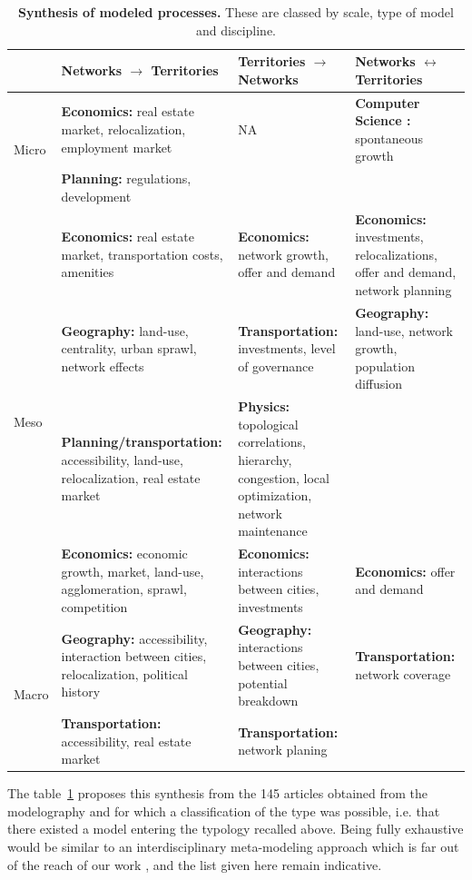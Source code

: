 \documentclass[10pt]{article}
\begin{document}
\begin{table}%
\caption{\textbf{Synthesis of modeled processes.} These are classed by scale, type of model and discipline. \label{tab:modelography:processes}}
\begin{tabular}{|l|p{5cm}|p{5cm}|p{5cm}|}
\hline
 & Networks $\rightarrow$ Territories & Territories $\rightarrow$ Networks & Networks $\leftrightarrow$ Territories\\ \hline
\multirow{2}{*}{Micro} &
\textbf{Economics: } real estate market, relocalization, employment market & NA & \textbf{Computer Science : } spontaneous growth \\\cline{2-2}
& \textbf{Planning: } regulations, development & & \\\hline
& \textbf{Economics: } real estate market, transportation costs, amenities & \textbf{Economics: } network growth, offer and demand & \textbf{Economics: } investments, relocalizations, offer and demand, network planning\\\cline{2-4}
\multirow{2}{*}{Meso}& \textbf{Geography: } land-use, centrality, urban sprawl, network effects & \textbf{Transportation: } investments, level of governance & \textbf{Geography: } land-use, network growth, population diffusion \\\cline{2-3}
& \textbf{Planning/transportation: } accessibility, land-use, relocalization, real estate market & \textbf{Physics: } topological correlations, hierarchy, congestion, local optimization, network maintenance & \\\hline
& \textbf{Economics: } economic growth, market, land-use, agglomeration, sprawl, competition & \textbf{Economics: } interactions between cities, investments & \textbf{Economics: } offer and demand \\ \cline{2-4}
\multirow{2}{*}{Macro} & \textbf{Geography: } accessibility, interaction between cities, relocalization, political history & \textbf{Geography: } interactions between cities, potential breakdown & \textbf{Transportation: } network coverage \\\cline{2-3}
& \textbf{Transportation: } accessibility, real estate market & \textbf{Transportation: } network planing & \\\hline
\end{tabular}
\end{table}

The table~\ref{tab:modelography:processes} proposes this synthesis from the 145 articles obtained from the modelography and for which a classification of the type was possible, i.e. that there existed a model entering the typology recalled above. Being fully exhaustive would be similar to an interdisciplinary meta-modeling approach which is far out of the reach of our work%
, and the list given here remain indicative.
\end{document}
